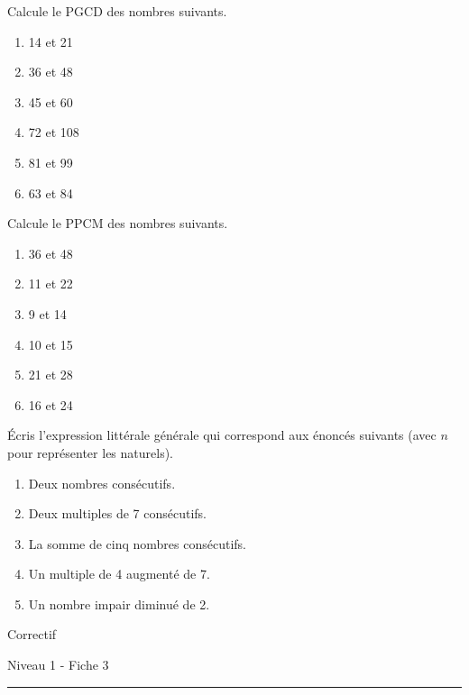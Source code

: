 \documentclass[12pt,parskip=half-, twoside=semi]{scrartcl}
\begin{document}
    \begin{exercise}
      Calcule le PGCD des nombres suivants.
    \begin{enumerate}[cols=3]
        \item 14 et 21
        \item 36 et 48
        \item 45 et 60
        \item 72 et 108
        \item 81 et 99
        \item 63 et 84
      \end{enumerate}
    \end{exercise}
    
    \begin{exercise}
      Calcule le PPCM des nombres suivants.
      \begin{enumerate}[cols=3]
        \item 36 et 48
        \item 11 et 22
        \item 9 et 14
        \item 10 et 15
        \item 21 et 28
        \item 16 et 24
      \end{enumerate}
    \end{exercise}
    
    \begin{exercise}
        Écris l'expression littérale générale qui correspond aux énoncés suivants (avec \(n\) pour représenter les naturels).
        \begin{enumerate}[cols=2]
            \item Deux nombres consécutifs. 
            \item Deux multiples de 7 consécutifs.
            \item La somme de cinq nombres consécutifs.
            \item Un multiple de 4 augmenté de 7.
            \item Un nombre impair diminué de 2.
        \end{enumerate}
      \end{exercise}

\newpage

\begin{center}
  \bfseries
  \begin{Huge}
    Correctif
  \end{Huge}
  \smallbreak
  \begin{large}
    Niveau 1  - Fiche 3
  \end{large}
  \smallbreak
  \rule[10pt]{.5\linewidth}{1 pt}
\end{center}
\end{document}
